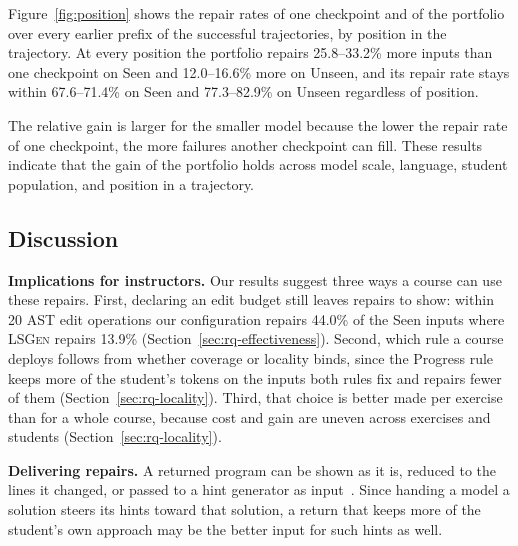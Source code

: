 \documentclass[10pt,conference]{IEEEtran}
\begin{document}
Figure~\ref{fig:position} shows the repair rates of one checkpoint and of the portfolio over every earlier prefix of the successful trajectories, by position in the trajectory. At every position the portfolio repairs 25.8--33.2\% more inputs than one checkpoint on Seen and 12.0--16.6\% more on Unseen, and its repair rate stays within 67.6--71.4\% on Seen and 77.3--82.9\% on Unseen regardless of position.

The relative gain is larger for the smaller model because the lower the repair rate of one checkpoint, the more failures another checkpoint can fill. These results indicate that the gain of the portfolio holds across model scale, language, student population, and position in a trajectory.

\subsection{Discussion}

\noindent\textbf{Implications for instructors.} Our results suggest three ways a course can use these repairs. First, declaring an edit budget still leaves repairs to show: within 20 AST edit operations our configuration repairs 44.0\% of the Seen inputs where \textsc{LSGen} repairs 13.9\% (Section~\ref{sec:rq-effectiveness}). Second, which rule a course deploys follows from whether coverage or locality binds, since the Progress rule keeps more of the student's tokens on the inputs both rules fix and repairs fewer of them (Section~\ref{sec:rq-locality}). Third, that choice is better made per exercise than for a whole course, because cost and gain are uneven across exercises and students (Section~\ref{sec:rq-locality}).

\noindent\textbf{Delivering repairs.} A returned program can be shown as it is, reduced to the lines it changed, or passed to a hint generator as input~\cite{phung2023generating,roest2024next}. Since handing a model a solution steers its hints toward that solution, a return that keeps more of the student's own approach may be the better input for such hints as well.
\end{document}
